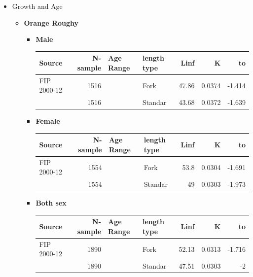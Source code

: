 \documentclass[11pt]{article}
\begin{document}
\begin{itemize}
\begin{itemize}
\end{itemize}


\item Growth and Age
\label{sec-5-1-2-3-2}%
\begin{itemize}
\item \textbf{Orange Roughy}
\begin{itemize}
\item \textbf{Male}


\begin{center}
\begin{tabular}{lrllrrr}
 Source       &  N-sample  &  Age Range  &  length type  &   Linf  &       K  &      to  \\
\hline
 FIP 2000-12  &      1516  &             &  Fork         &  47.86  &  0.0374  &  -1.414  \\
              &      1516  &             &  Standar      &  43.68  &  0.0372  &  -1.639  \\
\end{tabular}
\end{center}


\item \textbf{Female}


\begin{center}
\begin{tabular}{lrllrrr}
 Source       &  N-sample  &  Age Range  &  length type  &  Linf  &       K  &      to  \\
\hline
 FIP 2000-12  &      1554  &             &  Fork         &  53.8  &  0.0304  &  -1.691  \\
              &      1554  &             &  Standar      &    49  &  0.0303  &  -1.973  \\
\end{tabular}
\end{center}


\item \textbf{Both sex}


\begin{center}
\begin{tabular}{lrllrrr}
 Source       &  N-sample  &  Age Range  &  length type  &   Linf  &       K  &      to  \\
\hline
 FIP 2000-12  &      1890  &             &  Fork         &  52.13  &  0.0313  &  -1.716  \\
              &      1890  &             &  Standar      &  47.51  &  0.0303  &      -2  \\
\end{tabular}
\end{center}



\end{itemize}
\end{itemize}
\end{itemize}
\end{document}
